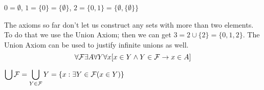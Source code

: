 \documentclass[11pt]{article}
\begin{document}
\begin{definition}[]
\(0=\emptyset\), \(1=\{0\}=\{\emptyset\}\), \(2=\{0,1\}=\{\emptyset,\{\emptyset\}\}\)
\end{definition}

The axioms so far don't let us construct any sets with more than two elements. To do that we use
the Union Axiom; then we can get \(3=2\cup\{2\}=\{0,1,2\}\). The Union Axiom can be used to justify
infinite unions as well.
\begin{equation*}
\forall\mathcal{F}\exists A\forall Y\forall x[x\in Y\wedge Y\in\mathcal{F}\to x\in A]
\end{equation*}

\begin{definition}[]
\(\displaystyle\bigcup\mathcal{F}=\bigcup_{Y\in\mathcal{F}}Y=\{x:\exists Y\in\mathcal{F}(x\in Y)\}\)
\end{definition}
\end{document}
